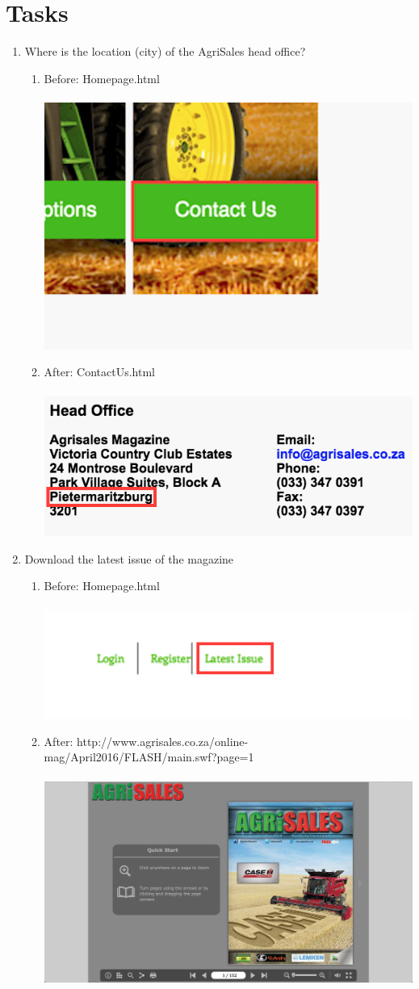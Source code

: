 \documentclass[11pt]{article}
\begin{document}
\section{Tasks}
	\begin{enumerate}
		\item Where is the location (city) of the AgriSales head office?
				\begin{enumerate}
					\item Before: Homepage.html \\ \\
						\includegraphics[width=0.3\linewidth]{../Images/Tasks/Task1Before}
					\item After: ContactUs.html \\ \\
						\includegraphics[width=0.5\linewidth]{../Images/Tasks/Task1After}
				\end{enumerate}
		\item Download the latest issue of the magazine
			\begin{enumerate}
				\item Before: Homepage.html \\ \\
					\includegraphics[width=0.7\linewidth]{../Images/Tasks/Task2Before}
				\item After: http://www.agrisales.co.za/online-mag/April2016/FLASH/main.swf?page=1 \\ \\
					\includegraphics[width=0.5\linewidth]{../Images/Tasks/Task2After}

\end{enumerate}
\end{enumerate}
\end{document}
